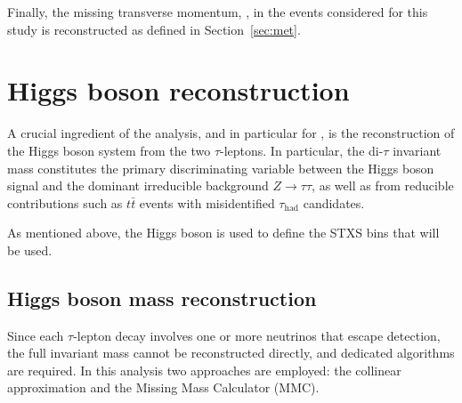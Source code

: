 Finally, the missing transverse momentum, \etmiss, in the events considered for this study is reconstructed as defined in Section~\ref{sec:met}.

\section{Higgs boson reconstruction}
\label{sec:higgs_reconstruction}

A crucial ingredient of the \htautau analysis, and in particular for \ttHtt, is the reconstruction of the Higgs boson system from the two $\tau$-leptons. In particular, the di-$\tau$ invariant mass constitutes the primary discriminating variable between the Higgs boson signal and the dominant irreducible background $Z\to\tau\tau$, as well as from reducible contributions such as $t\bar{t}$ events with misidentified $\tau_{\text{had}}$ candidates. 

As mentioned above, the Higgs boson \pt is used to define the \ttH STXS bins that will be used.

\subsection{Higgs boson mass reconstruction}
\label{subsec:higgs_pt}

Since each $\tau$-lepton decay involves one or more neutrinos that escape detection, the full invariant mass cannot be reconstructed directly, and dedicated algorithms are required. In this analysis two approaches are employed: the collinear approximation and the Missing Mass Calculator (MMC).  

